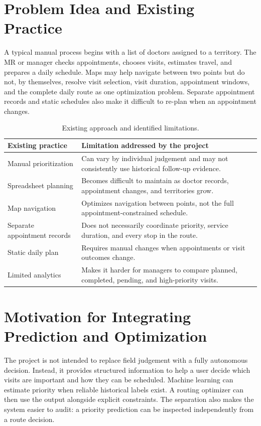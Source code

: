 \documentclass[12pt,a4paper,oneside]{report}
\begin{document}
\section{Problem Idea and Existing Practice}
A typical manual process begins with a list of doctors assigned to a territory. The MR or manager checks appointments, chooses visits, estimates travel, and prepares a daily schedule. Maps may help navigate between two points but do not, by themselves, resolve visit selection, visit duration, appointment windows, and the complete daily route as one optimization problem. Separate appointment records and static schedules also make it difficult to re-plan when an appointment changes.

\begin{table}[htbp]
\centering
\begin{tabularx}{\textwidth}{p{40mm}X}
\toprule
\textbf{Existing practice} & \textbf{Limitation addressed by the project}\\
\midrule
Manual prioritization & Can vary by individual judgement and may not consistently use historical follow-up evidence.\\
Spreadsheet planning & Becomes difficult to maintain as doctor records, appointment changes, and territories grow.\\
Map navigation & Optimizes navigation between points, not the full appointment-constrained schedule.\\
Separate appointment records & Does not necessarily coordinate priority, service duration, and every stop in the route.\\
Static daily plan & Requires manual changes when appointments or visit outcomes change.\\
Limited analytics & Makes it harder for managers to compare planned, completed, pending, and high-priority visits.\\
\bottomrule
\end{tabularx}
\caption{Existing approach and identified limitations.}
\label{tab:existing-limitations}
\end{table}

\section{Motivation for Integrating Prediction and Optimization}
The project is not intended to replace field judgement with a fully autonomous decision. Instead, it provides structured information to help a user decide which visits are important and how they can be scheduled. Machine learning can estimate priority when reliable historical labels exist. A routing optimizer can then use the output alongside explicit constraints. The separation also makes the system easier to audit: a priority prediction can be inspected independently from a route decision.
\end{document}
